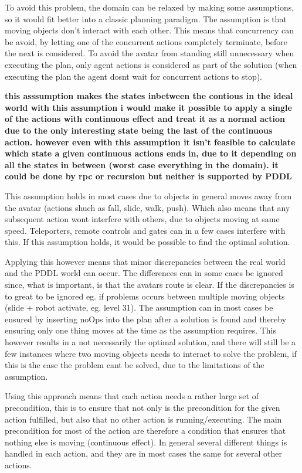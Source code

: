 		To avoid this problem, the domain can be relaxed by making some assumptions, so it would fit better into a classic planning paradigm. The assumption is that moving objects don't interact with each other. This means that concurrency can be avoid, by letting one of the concurrent actions completely terminate, before the next is considered. To avoid the avatar from standing still unnecessary when executing the plan, only agent actions is considered as part of the solution (when executing the plan the agent dosnt wait for concurrent actions to stop).
		
	\textbf{this asssumption makes the states inbetween the contious in the ideal world with this assumption i would make it possible to apply a single of the actions with continuous effect and treat it as a normal action due to the only interesting state being the last of the continuous action. however even with this assumption it isn't feasible to calculate which state a given continuous actions ends in, due to it depending on all the states in between (worst case everything in the domain). it could be done by rpc or recursion but neither is supported by PDDL}
		
		
		This assumption holds in most cases due to objects in general moves away from the avatar (actions shuch as fall, slide, walk, push). Which also means that any subsequent action wont interfere with others, due to objects moving at same speed. Teleporters, remote controls and gates can in a few cases interfere with this. If this assumption holds, it would be possible to find the optimal solution.
		
		Applying this however means that minor discrepancies between the real world and the PDDL world can occur. The differences can in some cases be ignored since, what is important, is that the avatars route is clear. If the discrepancies is to great to be ignored eg. if problems occurs between multiple moving objects (slide + robot activate, eg. {\huge level 31}). The assumption can in most cases be ensured by inserting noOps into the plan after a solution is found and thereby ensuring only one thing moves at the time as the assumption requires. This however results in a not necessarily the optimal solution, and there will still be a few instances where two moving objects needs to interact to solve the problem, if this is the case the problem cant be solved, due to the limitations of the assumption.
			
		Using this approach means that each action needs a rather large set of precondition, this is to ensure that not only is the precondition for the given action fulfilled, but also that no other action is running/executing. The main precondition for most of the action are therefore a condition that ensures that nothing else is moving (continuous effect). In general several different things is handled in each action, and they are in most cases the same for several other actions. %
		
